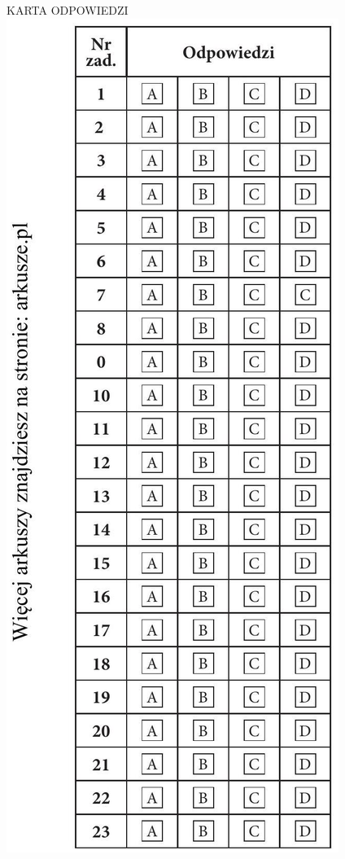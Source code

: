 \documentclass[10pt]{article}
\begin{document}
KARTA ODPOWIEDZI\\
\includegraphics[max width=\textwidth, center]{2024_11_21_4a1915d79134dda0750eg-21(1)}
\end{document}
